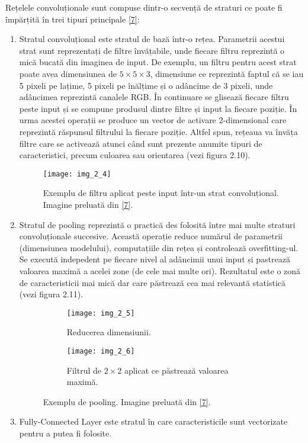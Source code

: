Rețelele convoluționale sunt compuse dintr-o secvență de straturi ce poate fi împărțită în trei tipuri principale \hyperlink{cs231n}{[7]}:
\begin{enumerate}
  \item Stratul convoluțional este stratul de bază într-o rețea. Parametrii acestui strat sunt reprezentați de filtre învățabile, unde fiecare filtru reprezintă o mică bucată din imaginea de input. De exemplu, un filtru pentru acest strat poate avea dimensiunea de $5 \times 5 \times 3$, dimensiune ce reprezintă faptul că se iau 5 pixeli pe lațime, 5 pixeli pe înălțime și o adâncime de 3 pixeli, unde adâncimea reprezintă canalele RGB. În continuare se glisează fiecare filtru peste input și se compune produsul dintre filtre și input la fiecare poziție. În urma acestei operații se produce un vector de activare 2-dimensional care reprezintă răspunsul filtrului la fiecare poziție. Altfel spun, rețeaua va învăța filtre care se activează atunci când sunt prezente anumite tipuri de caracteristici, precum culoarea sau orientarea (vezi figura 2.10).
\begin{figure}[!h]
	\centering
	\texttt{[image: img\_2\_4]}
	\caption[Exemplu de filtru aplicat peste input]{Exemplu de filtru aplicat peste input într-un strat convoluțional. Imagine preluată din \hyperlink{datameetsmedia}{[7]}.}
\end{figure}   
  
  \item Stratul de pooling reprezintă o practică des folosită între mai multe straturi convoluționale succesive. Această operație reduce numărul de parametrii (dimensiunea modelului), computațiile din rețea și controlează overfitting-ul. Se execută indepedent pe fiecare nivel al adâncimii unui input și pastrează valoarea maximă a acelei zone (de cele mai multe ori). Rezultatul este o zonă de caracteristicii mai mică dar care păstrează cea mai relevantă statistică (vezi figura 2.11).
\begin{figure}[!tbp]
  \begin{subfigure}[b]{0.4\textwidth}
    \texttt{[image: img\_2\_5]}
    \caption{Reducerea dimensiunii.}
    \label{fig:f1}
  \end{subfigure}
  \hfill
  \begin{subfigure}[b]{0.4\textwidth}
    \texttt{[image: img\_2\_6]}
    \caption{Filtrul de $2\times2$ aplicat ce păstrează valoarea maximă.}
    \label{fig:f2}
  \end{subfigure}
  \caption[Exemplu de pooling]{Exemplu de pooling. Imagine preluată din \hyperlink{datameetsmedia}{[7]}.}
\end{figure}
  
  \item Fully-Connected Layer este stratul în care caracteristicile sunt vectorizate pentru a putea fi folosite.
\end{enumerate}


